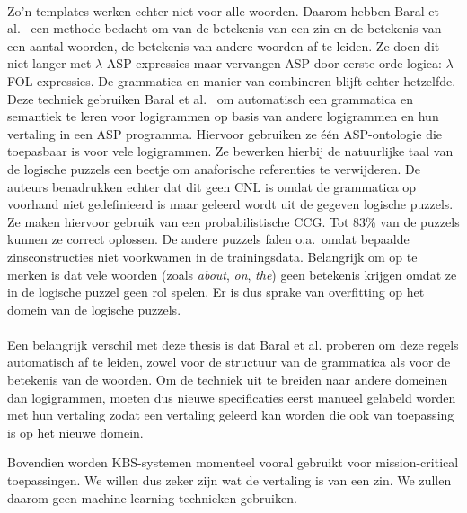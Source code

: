 \paragraph{}Zo'n templates werken echter niet voor alle woorden. Daarom hebben Baral et al.\ \cite{Baral2012} een methode bedacht om van de betekenis van een zin en de betekenis van een aantal woorden, de betekenis van andere woorden af te leiden. Ze doen dit niet langer met $\lambda$-ASP-expressies maar vervangen ASP door eerste-orde-logica: $\lambda$-FOL-expressies. De grammatica en manier van combineren blijft echter hetzelfde. Deze techniek gebruiken Baral et al.\ \cite{Baral2012a} om automatisch een grammatica en semantiek te leren voor logigrammen op basis van andere logigrammen en hun vertaling in een ASP programma. Hiervoor gebruiken ze \'e\'en ASP-ontologie die toepasbaar is voor vele logigrammen. Ze bewerken hierbij de natuurlijke taal van de logische puzzels een beetje om anaforische referenties te verwijderen. De auteurs benadrukken echter dat dit geen CNL is omdat de grammatica op voorhand niet gedefinieerd is maar geleerd wordt uit de gegeven logische puzzels. Ze maken hiervoor gebruik van een probabilistische CCG. Tot 83\% van de puzzels kunnen ze correct oplossen. De andere puzzels falen o.a.\ omdat bepaalde zinsconstructies niet voorkwamen in de trainingsdata. Belangrijk om op te merken is dat vele woorden (zoals \textit{about}, \textit{on}, \textit{the}) geen betekenis krijgen omdat ze in de logische puzzel geen rol spelen. Er is dus sprake van overfitting op het domein van de logische puzzels.

\paragraph{} Een belangrijk verschil met deze thesis is dat Baral et al. proberen om deze regels automatisch af te leiden, zowel voor de structuur van de grammatica als voor de betekenis van de woorden. Om de techniek uit te breiden naar andere domeinen dan logigrammen, moeten dus nieuwe specificaties eerst manueel gelabeld worden met hun vertaling zodat een vertaling geleerd kan worden die ook van toepassing is op het nieuwe domein.

Bovendien worden KBS-systemen momenteel vooral gebruikt voor mission-critical toepassingen. We willen dus zeker zijn wat de vertaling is van een zin. We zullen daarom geen machine learning technieken gebruiken.

